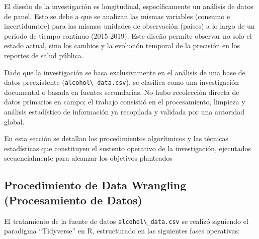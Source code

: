 \documentclass[oneside,11pt]{Latex/Classes/PhDthesisPSnPDF}
\begin{document}
El diseño de la investigación es longitudinal, específicamente un
análisis de datos de panel. Esto se debe a que se analizan las mismas
variables (consumo e incertidumbre) para las mismas unidades de
observación (países) a lo largo de un periodo de tiempo continuo
(2015-2019). Este diseño permite observar no solo el estado actual, sino
los cambios y la evolución temporal de la precisión en los reportes de
salud pública.

Dado que la investigación se basa exclusivamente en el análisis de una
base de datos preexistente (\texttt{alcohol\textbackslash{}\_data.csv}),
se clasifica como una investigación documental o basada en fuentes
secundarias. No hubo recolección directa de datos primarios en campo; el
trabajo consistió en el procesamiento, limpieza y análisis estadístico
de información ya recopilada y validada por una autoridad global.

En esta sección se detallan los procedimientos algorítmicos y las
técnicas estadísticas que constituyen el sustento operativo de la
investigación, ejecutados secuencialmente para alcanzar los objetivos
planteados\\

\subsection{Procedimiento de Data Wrangling (Procesamiento de Datos)}

El tratamiento de la fuente de datos
\texttt{alcohol\textbackslash{}\_data.csv} se realizó siguiendo el
paradigma ``Tidyverse'' en R, estructurado en las siguientes fases
operativas:
\end{document}
